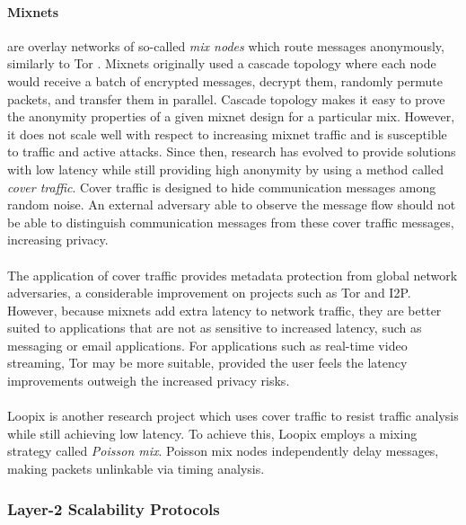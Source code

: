 \paragraph{Mixnets} are overlay networks of so-called \textit{mix nodes} which
route messages anonymously, similarly to Tor \cite{mixnets}. Mixnets originally
used a cascade topology where each node would receive a batch of encrypted messages,
decrypt them, randomly permute packets, and transfer them in parallel. Cascade
topology makes it easy to prove the anonymity properties of a given mixnet
design for a particular mix. However, it does not scale well with respect to
increasing mixnet traffic and is susceptible to traffic and active attacks.
Since then, research has evolved to provide solutions with low latency while
still providing high anonymity by using a method called \textit{cover traffic}. Cover
traffic is designed to hide communication messages among random noise. An
external adversary able to observe the message flow should not be able to
distinguish communication messages from these cover traffic messages, increasing
privacy.
\\~\\The application of cover traffic provides metadata protection from global network adversaries, a considerable improvement on projects such as Tor and I2P.
However, because mixnets add extra latency to network traffic, they are better suited to
applications that are not as sensitive to increased latency, such as messaging
or email applications. For applications such as real-time video streaming, Tor may be more suitable, provided the user feels the latency improvements outweigh the increased privacy risks.
\\~\\Loopix \cite{loopix} is another research project which uses cover traffic to
resist traffic analysis while still achieving low latency. To achieve this, Loopix
employs a mixing strategy called \textit{Poisson mix}. Poisson mix nodes
independently delay messages, making packets unlinkable via timing analysis.


\subsubsection{Layer-2 Scalability Protocols}
\label{sec:l2protocols}

